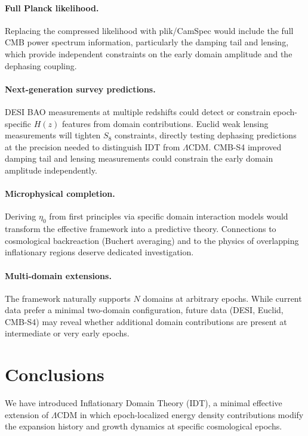 \documentclass[aps,prd,twocolumn,superscriptaddress,nofootinbib]{revtex4-2}
\begin{document}
\paragraph{Full Planck likelihood.}
Replacing the compressed likelihood with plik/CamSpec would
include the full CMB power spectrum information, particularly
the damping tail and lensing, which provide independent
constraints on the early domain amplitude and the dephasing
coupling.

\paragraph{Next-generation survey predictions.}
DESI BAO measurements at multiple redshifts could detect or
constrain epoch-specific $H(z)$ features from domain
contributions. Euclid weak lensing measurements will tighten
$S_8$ constraints, directly testing dephasing predictions at the
precision needed to distinguish IDT from $\Lambda$CDM. CMB-S4
improved damping tail and lensing measurements could constrain
the early domain amplitude independently.

\paragraph{Microphysical completion.}
Deriving $\eta_0$ from first principles via specific domain
interaction models would transform the effective framework into
a predictive theory. Connections to cosmological backreaction
(Buchert averaging) and to the physics of overlapping
inflationary regions deserve dedicated investigation.

\paragraph{Multi-domain extensions.}
The framework naturally supports $N$ domains at arbitrary epochs.
While current data prefer a minimal two-domain configuration,
future data (DESI, Euclid, CMB-S4) may reveal whether additional
domain contributions are present at intermediate or very early
epochs.


\section{Conclusions}
\label{sec:conclusions}

We have introduced Inflationary Domain Theory (IDT), a minimal
effective extension of $\Lambda$CDM in which epoch-localized energy
density contributions modify the expansion history and growth
dynamics at specific cosmological epochs.
\end{document}
